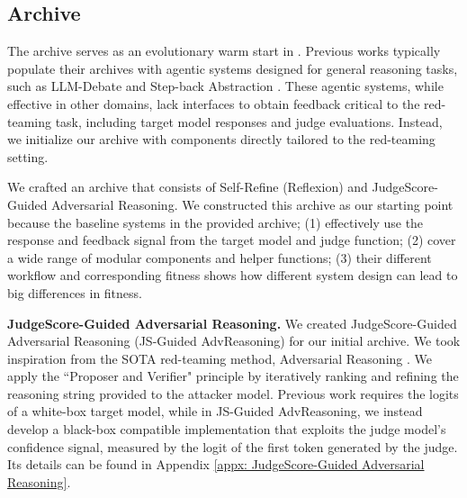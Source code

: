 \subsection{Archive}
\label{method:archive}
The archive serves as an evolutionary warm start in \method. Previous works typically populate their archives with agentic systems designed for general reasoning tasks, such as LLM-Debate \citep{du2023improvingfactualityreasoninglanguage} and Step-back Abstraction \citep{zheng2024stepbackevokingreasoning}. %
These agentic systems, while effective in other domains, lack interfaces to obtain feedback critical to the red-teaming task, including target model responses and judge evaluations. Instead, we initialize our archive with components directly tailored to the red-teaming setting.

We crafted an archive that consists of Self-Refine (Reflexion) \citep{madaan2023selfrefineiterativerefinementselffeedback} and JudgeScore-Guided Adversarial Reasoning. We constructed this archive as our starting point because the baseline systems in the provided archive; (1) effectively use the response and feedback signal from the target model and judge function; (2) cover a wide range of modular components and helper functions; (3) their different workflow and corresponding fitness shows how different system design can lead to big differences in fitness.

 
\textbf{JudgeScore-Guided Adversarial Reasoning.}
\label{method:JudgeScore-Guided Adversarial Reasoning}
We created JudgeScore-Guided Adversarial Reasoning (JS-Guided AdvReasoning) for our initial archive. We took inspiration from the SOTA red-teaming method, Adversarial Reasoning \citep{sabbaghi2025adversarial}. We apply the ``Proposer and Verifier" principle \citep{snell2024scaling} by iteratively ranking and refining the reasoning string provided to the attacker model. Previous work requires the logits of a white-box target model, while in JS-Guided AdvReasoning, we instead develop a black-box compatible implementation that exploits the judge model's confidence signal, measured by the logit of the first token generated by the judge. Its details can be found in Appendix \ref{appx: JudgeScore-Guided Adversarial Reasoning}.

